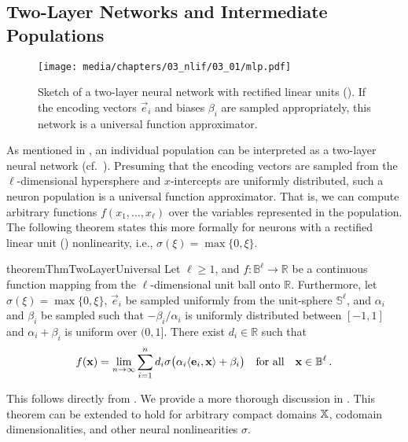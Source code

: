 \subsection{Two-Layer Networks and Intermediate Populations}
\label{sec:two_layer_intermediate}

\begin{figure}
	\texttt{[image: media/chapters/03\_nlif/03\_01/mlp.pdf]}
	\caption[Sketch of a two-layer neural network]{Sketch of a two-layer neural network with rectified linear units (\ReLUpl). If the encoding vectors $\vec e_i$ and biases $\beta_i$ are sampled appropriately, this network is a universal function approximator.}
	\label{fig:mlp}
\end{figure}

As mentioned in , an individual \NEF population can be interpreted as a two-layer neural network (cf.~).
Presuming that the encoding vectors are sampled from the $\ell$-dimensional hypersphere and $x$-intercepts are uniformly distributed, such a neuron population is a universal function approximator.
That is, we can compute arbitrary functions $f(x_1, \ldots, x_\ell)$ over the variables represented in the population.
The following theorem states this more formally for neurons with a rectified linear unit (\ReLU) nonlinearity, i.e., $\sigma(\xi) = \max\{0, \xi\}$.

\begin{restatable}{theorem}{ThmTwoLayerUniversal}
\label{thm:two_layer_universal}
Let $\ell \geq 1$, and $f : \mathbb{B}^\ell \longrightarrow \mathbb{R}$ be a continuous function mapping from the $\ell$-dimensional unit ball onto $\mathbb{R}$.
Furthermore, let $\sigma(\xi) = \max\{0, \xi\}$, $\vec e_i$ be sampled uniformly from the unit-sphere $\mathbb{S}^\ell$, and $\alpha_i$ and $\beta_i$ be sampled such that $-\beta_i / \alpha_i$ is uniformly distributed between $[-1, 1]$ and $\alpha_i + \beta_i$ is uniform over $(0, 1]$.
There exist $d_i \in \mathbb{R}$ such that
\begin{align}
	\vspace*{-0.5em}
	f(\vec x) = \lim_{\Npop \to \infty} \sum_{i = 1}^{\Npop} d_i \sigma\bigl( \alpha_i \langle \vec e_i, \vec x \rangle + \beta_i \bigr) \quad \text{for all} \quad \vec x \in \mathbb{B}^\ell \,.
	\label{eqn:two_layer_network}
\end{align}
\end{restatable}
\vspace*{-0.5em}\noindent
This follows directly from \citet{hornik1989multilayer}.
We provide a more thorough discussion in .
This theorem can be extended to hold for arbitrary compact domains $\mathbb{X}$, codomain dimensionalities, and other neural nonlinearities $\sigma$.

